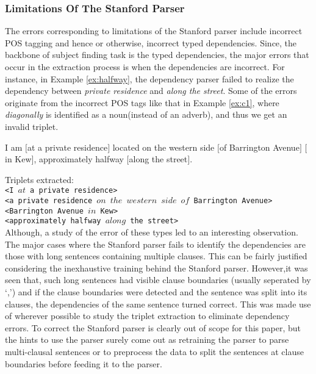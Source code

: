 \documentclass{acm_proc_article-sp}
\begin{document}
\subsubsection{Limitations Of The Stanford Parser}
\label{subsub:stanford}
The errors corresponding to limitations of the Stanford parser include incorrect POS tagging and hence or otherwise, incorrect typed dependencies. Since, the backbone of subject finding task is the typed dependencies, the major errors that occur in the extraction process is when the dependencies are incorrect. For instance, in Example \ref{ex:halfway}, the dependency parser failed to realize the dependency between \textit{private residence} and \textit{along the street}. Some of the errors originate from the incorrect POS tags like that in Example \ref{ex:c1}, where \textit{diagonally} is identified as a noun(instead of an adverb), and thus we get an invalid triplet. 
\begin{example}
\label{ex:halfway}
I am $[$at a private residence$]$ located on the western side $[$of Barrington Avenue$]$ $[$in Kew$]$, approximately halfway $[$along the street$]$.
\end{example}
Triplets extracted:\\
\texttt{<I $at$ a private residence>}\\
\texttt{<a private residence  $on$  $the$ $western$ $side$ $of$ Barrington Avenue>}\\
\texttt{<Barrington Avenue $in$ Kew>}\\
\texttt{<approximately halfway $along$ the street>}\\

Although, a study of the error of these types led to an interesting observation. The major cases where the Stanford parser fails to identify the dependencies are those with long sentences containing multiple clauses. This can be fairly justified considering the inexhaustive training behind the Stanford parser. However,it was seen that, such long sentences had visible clause boundaries (usually seperated by `,') and if the clause boundaries were detected and the sentence was split into its clauses, the dependencies of the same sentence turned correct. This was made use of wherever possible to study the triplet extraction to eliminate dependency errors. To correct the Stanford parser is clearly out of scope for this paper, but the hints to use the parser surely come out as retraining the parser to parse multi-clausal sentences or to preprocess the data to split the sentences at clause boundaries before feeding it to the parser.
\end{document}
